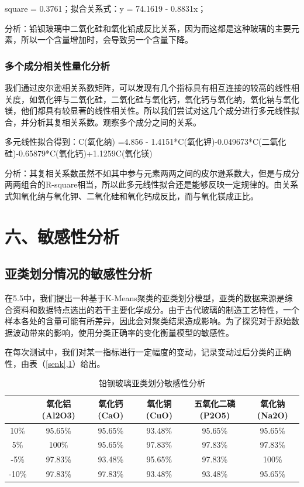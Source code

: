 \documentclass{my_paper}
\begin{document}
square = 0.3761；拟合关系式：y = 74.1619 - 0.8831x；

分析：铅钡玻璃中二氧化硅和氧化铅成反比关系，因为而这都是这种玻璃的主要元素，所以一个含量增加时，会导致另一个含量下降。

\subsubsection{多个成分相关性量化分析}

我们通过皮尔逊相关系数矩阵，可以发现有几个指标具有相互连接的较高的线性相关度，如氧化钾与二氧化硅，二氧化硅与氧化钙，氧化钙与氧化纳，氧化钠与氧化镁，他们都具有较显著的线性相关性。所以我们尝试对这几个成分进行多元线性拟合，并分析其复相关系数。观察多个成分之间的关系。

多元线性拟合得到：C(氧化纳) =4.856 - 1.4151*C(氧化钾)-0.049673*C(二氧化硅)-0.65879*C(氧化钙)+1.1259C(氧化镁)

分析：其复相关系数虽然不如其中参与元素两两之间的皮尔逊系数大，但是与成分两两组合的R-square相当，所以此多元线性拟合还是能够反映一定规律的。由关系式知氧化纳与氧化钾、二氧化硅和氧化钙成反比，而与氧化镁成正比。

\section{六、敏感性分析}
\subsection{亚类划分情况的敏感性分析}
在5.5中，我们提出一种基于K-Means聚类的亚类划分模型，亚类的数据来源是综合资料和数据特点选出的若干主要化学成分。由于古代玻璃的制造工艺特性，一个样本各处的含量可能有所差异，因此会对聚类结果造成影响。为了探究对于原始数据波动带来的影响，使用分类正确率的变化衡量模型的敏感性。

在每次测试中，我们对某一指标进行一定幅度的变动，记录变动过后分类的正确性，由表（\ref{senk},\ref{senb}）给出。

\begin{longtable}{cccccc}
\caption{铅钡玻璃亚类划分敏感性分析}
\label{senb} \\
\toprule
& 氧化铝(Al2O3) & 氧化钙(CaO) & 氧化铜(CuO) & 五氧化二磷(P2O5) & 氧化钠(Na2O) \\\midrule
10\%  & 95.65\%    & 95.65\%  & 93.48\%  & 95.65\%     & 95.65\%   \\
5\%   & 100\%      & 95.65\%  & 97.83\%  & 97.83\%     & 97.83\%   \\
-5\%  & 97.83\%    & 93.48\%  & 95.65\%  & 97.83\%     & 100\%     \\
-10\% & 97.83\%    & 97.83\%  & 93.48\%  & 93.48\%     & 95.65\%   \\
\bottomrule
\end{longtable}  
\end{document}
